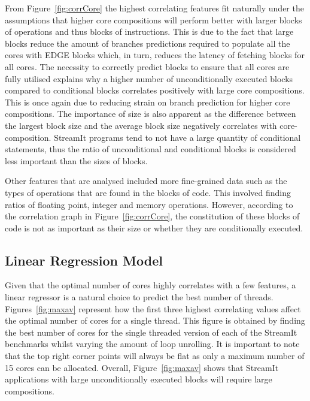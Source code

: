 From Figure~\ref{fig:corrCore} the highest correlating features fit naturally under the assumptions that higher core compositions will perform better with larger blocks of operations and thus blocks of instructions.
This is due to the fact that large blocks reduce the amount of branches predictions required to populate all the cores with EDGE blocks which, in turn, reduces the latency of fetching blocks for all cores.
The necessity to correctly predict blocks to ensure that all cores are fully utilised explains why a higher number of unconditionally executed blocks compared to conditional blocks correlates positively with large core compositions.
This is once again due to reducing strain on branch prediction for higher core compositions.
The importance of size is also apparent as the difference between the largest block size and the average block size negatively correlates with core-composition.
StreamIt programs tend to not have a large quantity of conditional statements, thus the ratio of unconditional and conditional blocks is considered less important than the sizes of blocks.

Other features that are analysed included more fine-grained data such as the types of operations that are found in the blocks of code.
This involved finding ratios of floating point, integer and memory operations.
However, according to the correlation graph in Figure~\ref{fig:corrCore}, the constitution of these blocks of code is not as important as their size or whether they are conditionally executed.


\subsection{Linear Regression Model}
Given that the optimal number of cores highly correlates with a few features, a linear regressor is a natural choice to predict the best number of threads.
Figures~\ref{fig:maxav} represent how the first three highest correlating values affect the optimal number of cores for a single thread.
This figure is obtained by finding the best number of cores for the single threaded version of each of the StreamIt benchmarks whilst varying the amount of loop unrolling.
It is important to note that the top right corner points will always be flat as only a maximum number of 15 cores can be allocated.
Overall, Figure~\ref{fig:maxav} shows that StreamIt applications with large unconditionally executed blocks will require large compositions.


